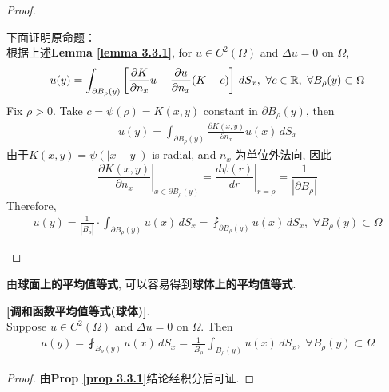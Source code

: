 \begin{proposition}
\begin{proof}
\begin{lemma}
				\vspace*{3em}
				
				下面证明原命题：\\
				根据上述\textbf{Lemma \ref{lemma 3.3.1}}, for $u \in C^2\left( \Omega \right)$ and $\Delta u = 0$ on $\Omega$, 
				\begin{align*}
					u(y) 
					= \int_{\partial B_{\rho}(y)} \left[ \frac{\partial K}{\partial n_x} u - \frac{\partial u}{\partial n_x} (K - c) \right] \, dS_x , \,\, \forall c \in \mathbb{R} , \,\, \forall B_{\rho}(y) \subset \Omega
				\end{align*}
				Fix $\rho > 0$. Take $c = \psi(\rho) = K(x , y)$ constant in $\partial B_{\rho}(y)$, then
				\begin{align*}
					u(y) 
					= \int_{\partial B_{\rho}(y)} \frac{\partial K(x , y)}{\partial n_x} u(x) \, dS_x
				\end{align*}
				由于$K(x , y) = \psi(| x - y |)$ is radial, and $n_x$ 为单位外法向, 因此
				\[ \left. \frac{\partial K(x , y)}{\partial n_x} \right|_{x \in \partial B_{\rho}(y)} 
				= \left. \frac{d \psi(r)}{d r} \right|_{r = \rho} 
				= \frac{1}{| \partial B_\rho |} \]
				Therefore, 
				\begin{align*}
					u(y) 
					= \frac{1}{| B_{\rho} |} \cdot \int_{\partial B_{\rho}(y)} u(x) \, dS_x 
					= \fint_{\partial B_{\rho}(y)} u(x) \, dS_x , \,\, \forall B_{\rho}(y) \subset \Omega
				\end{align*}
			\end{lemma}
		\end{proof}
	\end{proposition}
	
	\newpage
	
	由\textbf{球面上的平均值等式}, 可以容易得到\textbf{球体上的平均值等式}. 
	
	\vspace*{1em}
	
	\begin{corollary}\label{cor 3.3.2}
		\textbf{[调和函数平均值等式(球体)]}. \\
		Suppose $u \in C^2(\Omega)$ and $\Delta u = 0$ on $\Omega$. Then
		\begin{align*}
			u(y) 
			= \fint_{B_{\rho}(y)} u(x) \, dS_x 
			= \frac{1}{| B_\rho |} \int_{B_{\rho}(y)} u(x) \, dS_x , \,\, \forall B_{\rho}(y) \subset \Omega
		\end{align*}
		
		\vspace*{4em}
		
		\begin{proof}
			由\textbf{Prop \ref{prop 3.3.1}}结论经积分后可证. 
		\end{proof}
	\end{corollary}

